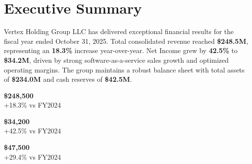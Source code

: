 \section*{Executive Summary}
Vertex Holding Group LLC has delivered exceptional financial results for the fiscal year ended October 31, 2025. Total consolidated revenue reached \textbf{\$248.5M}, representing an \textbf{18.3\%} increase year-over-year. Net Income grew by \textbf{42.5\%} to \textbf{\$34.2M}, driven by strong software-as-a-service sales growth and optimized operating margins. The group maintains a robust balance sheet with total assets of \textbf{\$234.0M} and cash reserves of \textbf{\$42.5M}.

\vspace{15pt}

\noindent
\begin{minipage}[t]{0.31\textwidth}
  \begin{tcolorbox}[
      title=Consolidated Revenue,
      colbacktitle=secondary,
      colframe=secondary,
      colback=neutralbg,
      arc=3pt,
      boxrule=0.8pt,
      fonttitle=\bfseries\scriptsize\color{white},
      coltitle=white,
      left=8pt, right=8pt, top=8pt, bottom=8pt,
      halign=center
  ]
    {\Large\textbf{\$248,500}} \\
    \scriptsize\color{neutraldark}+18.3\% vs FY2024
  \end{tcolorbox}
\end{minipage}\hfill
\begin{minipage}[t]{0.31\textwidth}
  \begin{tcolorbox}[
      title=Consolidated Net Income,
      colbacktitle=primary,
      colframe=primary,
      colback=neutralbg,
      arc=3pt,
      boxrule=0.8pt,
      fonttitle=\bfseries\scriptsize\color{white},
      coltitle=white,
      left=8pt, right=8pt, top=8pt, bottom=8pt,
      halign=center
  ]
    {\Large\textbf{\$34,200}} \\
    \scriptsize\color{neutraldark}+42.5\% vs FY2024
  \end{tcolorbox}
\end{minipage}\hfill
\begin{minipage}[t]{0.31\textwidth}
  \begin{tcolorbox}[
      title=Operating Cash Flow,
      colbacktitle=accent,
      colframe=accent,
      colback=neutralbg,
      arc=3pt,
      boxrule=0.8pt,
      fonttitle=\bfseries\scriptsize\color{white},
      coltitle=white,
      left=8pt, right=8pt, top=8pt, bottom=8pt,
      halign=center
  ]
    {\Large\textbf{\$47,500}} \\
    \scriptsize\color{neutraldark}+29.4\% vs FY2024
  \end{tcolorbox}
\end{minipage}

\par\vspace{15pt}
